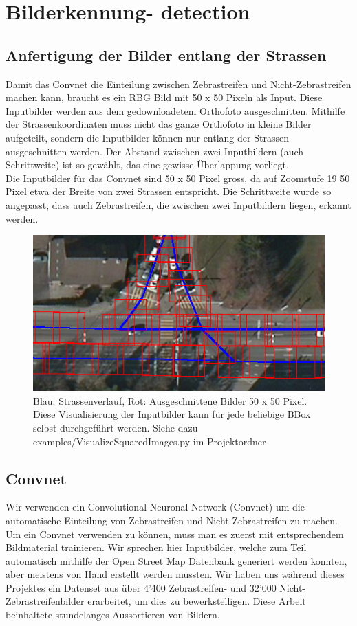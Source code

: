 \section{Bilderkennung- detection}

\subsection{Anfertigung der Bilder entlang der Strassen}
Damit das Convnet die Einteilung zwischen Zebrastreifen und Nicht-Zebrastreifen machen kann, braucht es ein RBG Bild mit 50 x 50 Pixeln als Input. Diese Inputbilder werden aus dem gedownloadetem Orthofoto ausgeschnitten. Mithilfe der Strassenkoordinaten muss nicht das ganze Orthofoto in kleine Bilder aufgeteilt, sondern die Inputbilder können nur entlang der Strassen ausgeschnitten werden. Der Abstand zwischen zwei Inputbildern (auch Schrittweite) ist so gewählt, das eine gewisse Überlappung vorliegt.
\\
Die Inputbilder für das Convnet sind 50 x 50 Pixel gross, da auf Zoomstufe 19 50 Pixel etwa der Breite von zwei Strassen entspricht. Die Schrittweite wurde so angepasst, dass auch Zebrastreifen, die zwischen zwei Inputbildern liegen, erkannt werden.
\\
\begin{figure}[H]
	\centering
	\includegraphics{images/squared_images.png}
	\caption{Blau: Strassenverlauf, Rot: Ausgeschnittene Bilder 50 x 50 Pixel. Diese Visualisierung der Inputbilder kann für jede beliebige BBox selbst durchgeführt werden. Siehe dazu examples/VisualizeSquaredImages.py im Projektordner}
\end{figure}



\subsection{Convnet}
Wir verwenden ein Convolutional Neuronal Network (Convnet) um die automatische Einteilung von Zebrastreifen und Nicht-Zebrastreifen zu machen. Um ein Convnet verwenden zu können, muss man es zuerst mit entsprechendem Bildmaterial trainieren. Wir sprechen hier Inputbilder, welche zum Teil automatisch mithilfe der Open Street Map Datenbank generiert werden konnten, aber meistens von Hand erstellt werden mussten. Wir haben uns während dieses Projektes ein Datenset aus über 4'400 Zebrastreifen- und 32'000 Nicht-Zebrastreifenbilder erarbeitet, um dies zu bewerkstelligen. Diese Arbeit beinhaltete stundelanges Aussortieren von Bildern.
\\

